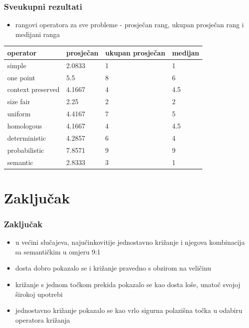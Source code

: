 \documentclass{beamer}
\begin{document}
\begin{frame}
\frametitle{Sveukupni rezultati}
\begin{itemize}
\item{rangovi operatora za sve probleme - prosječan rang, ukupan prosječan rang i medijani ranga}
\end{itemize}
\begin{table}[H]
 	\centering
    \begin{tabular}{| l | l | l | l |}
    \hline
   \textbf{operator} & \textbf{prosječan} & \textbf{ukupan prosječan}
    & \textbf{medijan} \\ \hline
   simple & 2.0833 & 1 & 1\\ \hline
   one point & 5.5 & 8 & 6\\ \hline
   context preserved & 4.1667 & 4 & 4.5\\ \hline
   size fair & 2.25 & 2 & 2\\ \hline
   uniform & 4.4167 & 7 & 5\\ \hline
   homologous & 4.1667 & 4 & 4.5\\ \hline
   deterministic & 4.2857 & 6 & 4\\ \hline
   probabilistic & 7.8571 & 9 & 9\\ \hline
   semantic & 2.8333 & 3 &  1\\ \hline

 
    \end{tabular}
\end{table}
\end{frame}

\section{Zaključak}

\begin{frame}
\frametitle{Zaključak}
\begin{itemize}
\item{u većini slučajeva, najučinkovitije jednostavno križanje i njegova kombinacija sa semantičkim u omjeru 9:1}
\item{dosta dobro pokazalo se i križanje pravedno s obzirom na veličinu}
\item{križanje s jednom točkom prekida pokazalo se kao dosta loše, unatoč svojoj širokoj upotrebi}
\item{jednostavno križanje pokazalo se kao vrlo sigurna polazišna točka u odabiru operatora križanja}
\end{itemize}

\end{frame}
\end{document}

